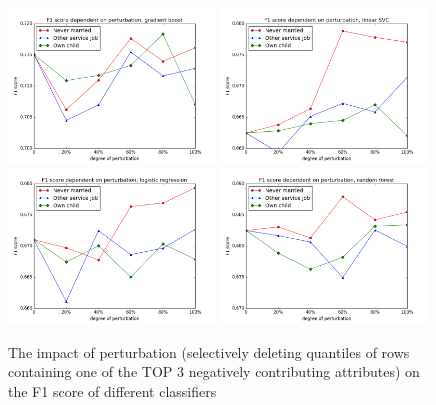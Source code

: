 \documentclass{llncs}
\begin{document}
\begin{figure}[!t]
	\begin{center}
		\includegraphics[width=0.49\textwidth]{figures/results/perturb_gradient_boost_bottom}
		\includegraphics[width=0.49\textwidth]{figures/results/perturb_linear_svc_bottom}
		\includegraphics[width=0.49\textwidth]{figures/results/perturb_logistic_regression_bottom}
		\includegraphics[width=0.49\textwidth]{figures/results/perturb_random_forest_bottom}
		\caption{The impact of perturbation (selectively deleting quantiles of rows containing one of the TOP 3 negatively contributing attributes) on the F1 score of different classifiers}
		\label{fig:adult_results_perturbation_bottom}
	\end{center}
\end{figure}
\end{document}
